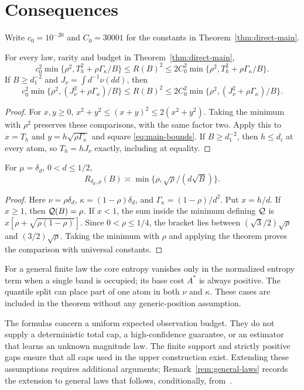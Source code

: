 \section{Consequences}\label{sec:consequences}
Write $c_0=10^{-20}$ and $C_0=30001$ for the constants in
Theorem~\ref{thm:direct-main}.

\begin{corollary}\label{cor:mse}
For every law, rarity and budget in Theorem~\ref{thm:direct-main},
\[
 c_0^2\min\{\rho^2,T_h^2+\rho\Gamma_\kappa/B\}
 \le R(B)^2
 \le2C_0^2\min\{\rho^2,T_h^2+\rho\Gamma_\kappa/B\}.
\]
If $B\ge d_1^{-2}$ and $J_\nu=\int d^{-1}\nu(dd)$, then
\[
 c_0^2\min\{\rho^2,(J_\nu^2+\rho\Gamma_\kappa)/B\}
 \le R(B)^2
 \le2C_0^2\min\{\rho^2,(J_\nu^2+\rho\Gamma_\kappa)/B\}.
\]
\end{corollary}
\begin{proof}
For $x,y\ge0$, $x^2+y^2\le(x+y)^2\le2(x^2+y^2)$.
Taking the minimum with $\rho^2$ preserves these comparisons,
with the same factor two. Apply this to $x=T_h$ and
$y=h\sqrt{\rho\Gamma_\kappa}$ and square
\eqref{eq:main-bounds}. If $B\ge d_1^{-2}$, then $h\le d_i$
at every atom, so $T_h=hJ_\nu$ exactly, including at equality.
\end{proof}

\begin{corollary}\label{cor:one-gap}
For $\mu=\delta_d$, $0<d\le1/2$,
\[
 R_{\delta_d,\rho}(B)\asymp
       \min\{\rho,\sqrt{\rho}/(d\sqrt B)\}.
\]
\end{corollary}
\begin{proof}
Here $\nu=\rho\delta_d$, $\kappa=(1-\rho)\delta_d$, and
$\Gamma_\kappa=(1-\rho)/d^2$. Put $x=h/d$. If $x\ge1$,
then $\mathcal Q(B)=\rho$. If $x<1$, the sum inside the minimum
defining $\mathcal Q$ is $x[\rho+\sqrt{\rho(1-\rho)}]$.
Since $0<\rho\le1/4$, the bracket lies between
$(\sqrt3/2)\sqrt\rho$ and $(3/2)\sqrt\rho$.
Taking the minimum with $\rho$ and applying the theorem proves
the comparison with universal constants.
\end{proof}

For a general finite law the core entropy vanishes only in the
normalized entropy term when a single band is occupied; its base
cost $A^*$ is always positive. The quantile split can place part
of one atom in both $\nu$ and $\kappa$. These cases are included
in the theorem without any generic-position assumption.

The formulas concern a uniform expected observation budget.
They do not supply a deterministic total cap, a high-confidence
guarantee, or an estimator that learns an unknown magnitude law.
The finite support and strictly positive gaps ensure that all
caps used in the upper construction exist. Extending these
assumptions requires additional arguments; Remark~\ref{rem:general-laws}
records the extension to general laws that follows, conditionally,
from~\cite{gl}.
